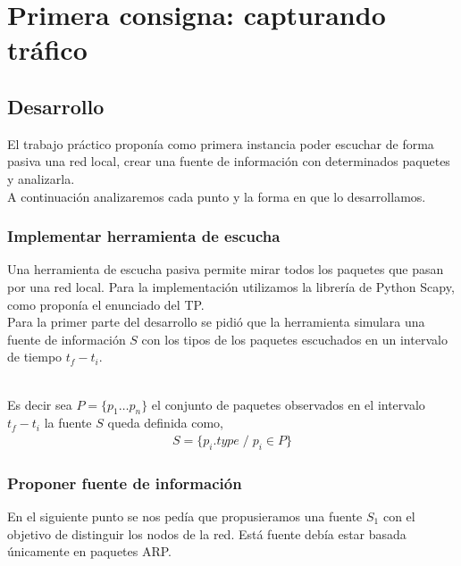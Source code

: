 \section{Primera consigna: capturando tr\'afico}
\subsection{Desarrollo}
El trabajo pr\'actico propon\'ia como primera instancia poder escuchar de forma pasiva una red local, crear una fuente de informaci\'on con determinados paquetes y analizarla.\\
A continuaci\'on analizaremos cada punto y la forma en que lo desarrollamos.\\

\subsubsection{Implementar herramienta de escucha}

Una herramienta de escucha pasiva permite mirar todos los paquetes que pasan por una red local. Para la implementaci\'on utilizamos la librer\'ia de Python Scapy, como propon\'ia el enunciado del TP.\\
Para la primer parte del desarrollo se pidi\'o que la herramienta simulara una fuente de informaci\'on $S$ con los tipos de los paquetes escuchados en un intervalo de tiempo $t_{f} - t_{i}$. \\\

Es decir sea $P = \{ p_{1} \ldots p_{n} \}$ el conjunto de paquetes observados en el intervalo $t_{f} - t_{i}$ la
fuente $S$ queda definida como, \\
\begin{gather*}
S = \{ p_{i}.type \; / \; p_{i} \in P \} 
\end{gather*}
\vspace{0.5cm}  

\subsubsection{Proponer fuente de informaci\'on}

En el siguiente punto se nos ped\'ia que propusieramos una fuente $S_{1} $ con el objetivo de distinguir los nodos de la red. Est\'a fuente deb\'ia estar basada \'unicamente en paquetes ARP. \\

